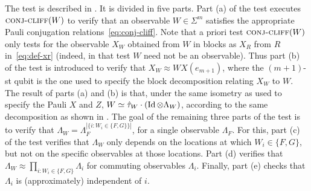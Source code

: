 \documentclass{toc}
\newcommand{\Id}{\ensuremath{\mathop{\rm Id}\nolimits}}
\newcommand{\conjc}{\textsc{conj-cliff}}
\newcommand{\phase}{\Lambda}
\begin{document}
The test is described in . It is divided in five
parts. Part (a) of the test executes  $\conjc(W)$ to verify that an observable
$W\in\Sigma^m$ satisfies the appropriate Pauli conjugation
relations~\eqref{eq:conj-cliff}. Note that a priori test $\conjc(W)$ only tests
for the observable $X_W$ obtained from $W$ in blocks as $X_R$ from $R$
in~\eqref{eq:def-xr} (indeed, in that test $W$ need not be an observable). Thus
part (b) of the test is introduced to verify that $X_W \approx W X(e_{m+1})$, where the $(m+1)$-st qubit is the one used to specify the block decomposition relating $X_W$ to $W$.  The result of parts (a) and (b) is that, under the same isometry as used to specify the Pauli $X$ and $Z$, $W\simeq \hat{\tau}_W \cdot (\Id\otimes \phase_W)$, according to the same decomposition as shown in . The goal of the remaining three parts of the test is to verify that $\phase_W = \phase_F^{|\{i: W_i \in \{F,G\}\}|}$, for a single observable $\phase_F$. For this, part (c) of the test verifies that $\phase_W$ only depends on the locations at which $W_i\in\{F,G\}$, but not on the specific observables at those locations. Part (d) verifies that $\phase_W \approx \prod_{i: W_i\in \{F,G\}} \phase_i $ for commuting observables $\phase_i$. Finally, part (e) checks that $\phase_i$ is (approximately) independent of $i$. 
\end{document}
